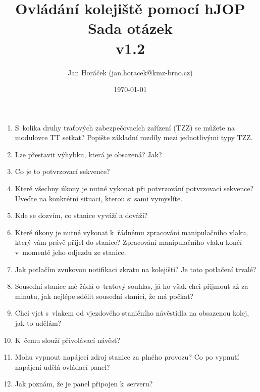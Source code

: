 \documentclass[12pt,a4paper]{article}
\begin{document}
\thispagestyle{empty}
\noindent

\title{
\Large Ovládání kolejiště pomocí hJOP\\
\LARGE Sada otázek\\
\small v1.2}
\author{Jan Horáček (jan.horacek@kmz-brno.cz)}
\date{\today}
\maketitle

\begin{enumerate}[leftmargin=*]
	\item S~kolika druhy traťových zabezpečovacích zařízení (TZZ) se můžete na modulovce TT setkat? Popište základní rozdíly mezi jednotlivými typy TZZ.
	
	\item Lze přestavit výhybku, která je obsazená? Jak?
	
	\item Co je to potvrzovací sekvence?
	
	\item Které všechny úkony je nutné vykonat při potvrzování potvrzovací sekvence? Uveďte na konkrétní situaci, kterou si sami vymyslíte.
	
	\item Kde se dozvím, co stanice vyváží a dováží?
	
	\item Které úkony je nutné vykonat k~řádnému zpracování manipulačního vlaku, který vám právě přijel do stanice? Zpracování manipulačního vlaku končí v~momentě jeho odjezdu ze stanice.
	
	\item Jak potlačím zvukovou notifikaci zkratu na kolejišti? Je toto potlačení trvalé?
	
	\item Sousední stanice mě žádá o~traťový souhlas, já ho však chci přijmout až za minutu, jak nejlépe sdělit sousední stanici, že má počkat?
	
	\item Chci vjet s~vlakem od vjezdového staničního návěstidla na obsazenou kolej, jak to udělám?
	
	\item K~čemu slouží přivolávací návěst?
	
	\item Mohu vypnout napájecí zdroj stanice za plného provozu? Co po vypnutí napájení udělá ovládací panel?
	
	\item Jak poznám, že je panel připojen k~serveru?
	

\end{enumerate}
\end{document}
